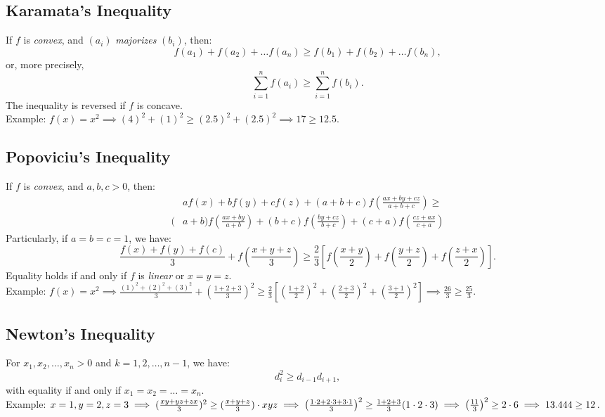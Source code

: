 \documentclass[a4paper,11pt]{article}
\begin{document}
\subsection{Karamata's Inequality}
\begin{tcolorbox}[breakable]
    If $f$ is \emph{convex}, and $(a_i)$ \emph{majorizes} $(b_i)$, then:
    \[
    f(a_1) + f(a_2) + \dots f(a_n) \geq f(b_1) + f(b_2) + \dots f(b_n),
    \]
    or, more precisely,
    \[
    \sum_{i=1}^n f(a_i) \geq \sum_{i=1}^n f(b_i).
    \]
    The inequality is reversed if $f$ is concave. \\[6pt]
    Example: $\textstyle f(x) = x^2 \implies (4)^2 + (1)^2 \geq (2.5)^2 + (2.5)^2 \implies 17 \geq 12.5$.
\end{tcolorbox}


\subsection{Popoviciu's Inequality}
\begin{tcolorbox}[breakable]
    If $f$ is \emph{convex}, and $a, b, c > 0$, then:
    \begin{align*}
        &af(x) + bf(y) + cf(z) + (a+b+c) f\left(\frac{ax + by + cz}{a+b+c}\right) \geq \\[4pt]
        (&a+b) f\left(\frac{ax + by}{a+b}\right) + (b+c) f\left(\frac{by+cz}{b+c}\right) + (c+a) f\left(\frac{cz+ax}{c+a}\right)
    \end{align*}
    Particularly, if $a=b=c=1$, we have:
    \[
    \frac{f(x) + f(y) + f(c)}{3} + f \left( \frac{x+y+z}{3} \right) \geq \frac{2}{3} \left[ f\left(\frac{x+y}{2}\right) + f \left(\frac{y+z}{2}\right) + f \left(\frac{z+x}{2}\right) \right].
    \]
    Equality holds if and only if $f$ is \emph{linear} or $x=y=z$. \\[6pt]
    Example: $\textstyle f(x) = x^2 \implies \frac{(1)^2 + (2)^2 + (3)^2}{3} + \left(\frac{1+2+3}{3}\right)^2 \geq \frac{2}{3} \left[ \left(\frac{1+2}{2}\right)^2 + \left(\frac{2+3}{2}\right)^2 + \left(\frac{3+1}{2}\right)^2 \right] \implies \frac{26}{3} \geq \frac{25}{3}$.
\end{tcolorbox}


\subsection{Newton's Inequality}
\begin{tcolorbox}[breakable]
    For $x_1, x_2, \dots, x_n > 0$ and $k=1,2,\dots,n-1$, we have:
    \[
    d_i^2 \geq d_{i-1}d_{i+1},
    \]
    with equality if and only if $x_1 = x_2 = \dots = x_n$. \\[6pt]
    Example: $\textstyle x=1, y=2, z=3 \implies (\frac{xy + yz + zx}{3})^2 \geq (\frac{x+y+z}{3})\cdot xyz \\[6pt]
    \implies \left(\frac{1\cdot2 + 2\cdot3 + 3\cdot1}{3}\right)^2 \geq \frac{1+2+3}{3} (1\cdot2\cdot3) \implies \left(\frac{11}{3}\right)^2 \geq 2 \cdot 6 \implies 13.444 \geq 12$.
\end{tcolorbox}
\end{document}
